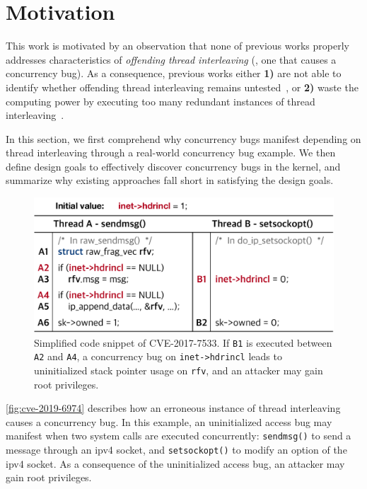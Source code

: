 \section{Motivation}
\label{s:motivation}



%
This work is motivated by an observation that none of previous works
properly addresses characteristics of \textit{offending thread
  interleaving} (\ie, one that causes a concurrency bug).
%
As a consequence, previous works either \textbf{1)} are not able to
identify whether offending thread interleaving remains
untested~\cite{krace}, or \textbf{2)} waste the computing power by
executing too many redundant instances of thread
interleaving~\cite{snowboard, razzer}.


In this section, we first comprehend why concurrency bugs manifest
depending on thread interleaving through a real-world concurrency bug
example.
%
We then define design goals to effectively discover concurrency bugs
in the kernel, and summarize why existing approaches fall short in
satisfying the design goals.


%
\begin{figure}[t]
  \centering
  \includegraphics[width=0.95\linewidth]{fig/cve-2017-10661.pdf}
  \caption{Simplified code snippet of CVE-2017-7533. If \texttt{B1} is
    executed between \texttt{A2} and \texttt{A4}, a concurrency bug on
    \texttt{inet->hdrincl} leads to uninitialized stack pointer usage
    on \texttt{rfv}, and an attacker may gain root privileges.}
  \label{fig:cve-2019-6974}
\end{figure}
%
\autoref{fig:cve-2019-6974} describes how an erroneous instance of
thread interleaving causes a concurrency bug.
%
In this example, an uninitialized access bug may manifest when two
system calls are executed concurrently: \texttt{sendmsg()} to send a
message through an ipv4 socket, and \texttt{setsockopt()} to modify an
option of the ipv4 socket. As a consequence of the uninitialized
access bug, an attacker may gain root privileges.



